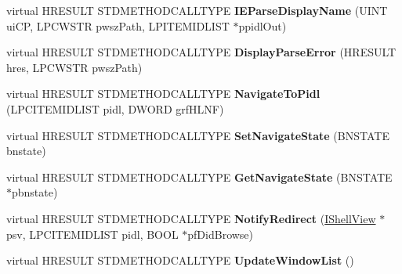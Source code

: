 \begin{DoxyCompactItemize}
\item 
\mbox{\label{class_c_shell_browser_a45e5cb5211988ddfa88b7566b5a81af8}} 
virtual H\+R\+E\+S\+U\+LT S\+T\+D\+M\+E\+T\+H\+O\+D\+C\+A\+L\+L\+T\+Y\+PE {\bfseries I\+E\+Parse\+Display\+Name} (U\+I\+NT ui\+CP, L\+P\+C\+W\+S\+TR pwsz\+Path, L\+P\+I\+T\+E\+M\+I\+D\+L\+I\+ST $\ast$ppidl\+Out)
\item 
\mbox{\label{class_c_shell_browser_a039bca2bf4e8a2e159bd5b84c2625f18}} 
virtual H\+R\+E\+S\+U\+LT S\+T\+D\+M\+E\+T\+H\+O\+D\+C\+A\+L\+L\+T\+Y\+PE {\bfseries Display\+Parse\+Error} (H\+R\+E\+S\+U\+LT hres, L\+P\+C\+W\+S\+TR pwsz\+Path)
\item 
\mbox{\label{class_c_shell_browser_a43ff6714250c6b152220a3aa4f81f7c0}} 
virtual H\+R\+E\+S\+U\+LT S\+T\+D\+M\+E\+T\+H\+O\+D\+C\+A\+L\+L\+T\+Y\+PE {\bfseries Navigate\+To\+Pidl} (L\+P\+C\+I\+T\+E\+M\+I\+D\+L\+I\+ST pidl, D\+W\+O\+RD grf\+H\+L\+NF)
\item 
\mbox{\label{class_c_shell_browser_ac019a48e6ec1e9dc6ff9abb7aea32b59}} 
virtual H\+R\+E\+S\+U\+LT S\+T\+D\+M\+E\+T\+H\+O\+D\+C\+A\+L\+L\+T\+Y\+PE {\bfseries Set\+Navigate\+State} (B\+N\+S\+T\+A\+TE bnstate)
\item 
\mbox{\label{class_c_shell_browser_a8f1dcd1899b12c7d7d26d0ed263aa041}} 
virtual H\+R\+E\+S\+U\+LT S\+T\+D\+M\+E\+T\+H\+O\+D\+C\+A\+L\+L\+T\+Y\+PE {\bfseries Get\+Navigate\+State} (B\+N\+S\+T\+A\+TE $\ast$pbnstate)
\item 
\mbox{\label{class_c_shell_browser_ab204a596fe7e406dc9ddcb2b70333651}} 
virtual H\+R\+E\+S\+U\+LT S\+T\+D\+M\+E\+T\+H\+O\+D\+C\+A\+L\+L\+T\+Y\+PE {\bfseries Notify\+Redirect} (\hyperlink{interface_i_shell_view}{I\+Shell\+View} $\ast$psv, L\+P\+C\+I\+T\+E\+M\+I\+D\+L\+I\+ST pidl, B\+O\+OL $\ast$pf\+Did\+Browse)
\item 
\mbox{\label{class_c_shell_browser_a8f66f11d26983e6e0439d328e86611c3}} 
virtual H\+R\+E\+S\+U\+LT S\+T\+D\+M\+E\+T\+H\+O\+D\+C\+A\+L\+L\+T\+Y\+PE {\bfseries Update\+Window\+List} ()
\item 
\mbox{\label{class_c_shell_browser_a15617979a60043d99379bf3ef96d22c0}} 

\end{DoxyCompactItemize}
